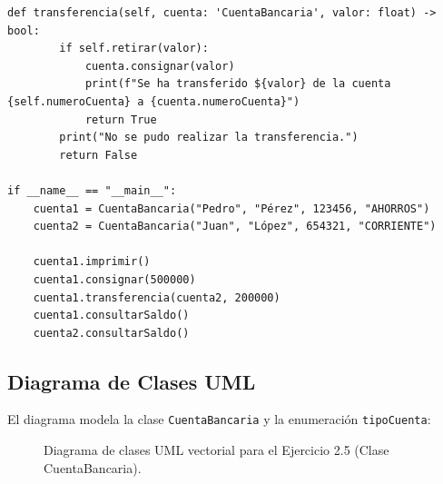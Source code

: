 \documentclass[11pt,a4paper]{article}
\newcommand{\umlm}{$-$\,}
\newcommand{\umlp}{$+$\,}
\newcommand{\estereo}[1]{\guillemotleft\,#1\,\guillemotright}
\begin{document}
\begin{lstlisting}[caption={Implementación de la clase CuentaBancaria (\texttt{Actividad2\_Ejercicio2\_5\_CuentaBancaria.py})}]
    def transferencia(self, cuenta: 'CuentaBancaria', valor: float) -> bool:
        if self.retirar(valor):
            cuenta.consignar(valor)
            print(f"Se ha transferido ${valor} de la cuenta {self.numeroCuenta} a {cuenta.numeroCuenta}")
            return True
        print("No se pudo realizar la transferencia.")
        return False

if __name__ == "__main__":
    cuenta1 = CuentaBancaria("Pedro", "Pérez", 123456, "AHORROS")
    cuenta2 = CuentaBancaria("Juan", "López", 654321, "CORRIENTE")

    cuenta1.imprimir()
    cuenta1.consignar(500000)
    cuenta1.transferencia(cuenta2, 200000)
    cuenta1.consultarSaldo()
    cuenta2.consultarSaldo()
\end{lstlisting}

\subsection{Diagrama de Clases UML}
El diagrama modela la clase \texttt{CuentaBancaria} y la enumeración \texttt{tipoCuenta}:

\begin{figure}[H]
    \centering
    \caption{Diagrama de clases UML vectorial para el Ejercicio 2.5 (Clase CuentaBancaria).}
    \label{fig:uml_ej2_5}
\end{figure}
\end{document}
